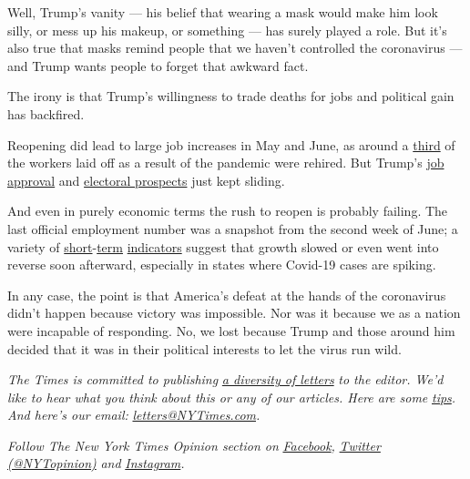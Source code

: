 Well, Trump's vanity --- his belief that wearing a mask would make him
look silly, or mess up his makeup, or something --- has surely played a
role. But it's also true that masks remind people that we haven't
controlled the coronavirus --- and Trump wants people to forget that
awkward fact.

The irony is that Trump's willingness to trade deaths for jobs and
political gain has backfired.

Reopening did lead to large job increases in May and June, as around a
\href{https://fred.stlouisfed.org/series/PAYEMS}{third} of the workers
laid off as a result of the pandemic were rehired. But Trump's
\href{https://projects.fivethirtyeight.com/trump-approval-ratings/?ex_cid=rrpromo}{job
approval} and
\href{https://projects.economist.com/us-2020-forecast/president}{electoral
prospects} just kept sliding.

And even in purely economic terms the rush to reopen is probably
failing. The last official employment number was a snapshot from the
second week of June; a variety of
\href{https://twitter.com/SaraEisen/status/1279897244494450694}{short}-\href{https://twitter.com/paulkrugman/status/1279885912059641857}{term}
\href{https://www.cnbc.com/2020/06/26/the-employment-recovery-may-be-slowing-as-virus-cases-climb.html}{indicators}
suggest that growth slowed or even went into reverse soon afterward,
especially in states where Covid-19 cases are spiking.

In any case, the point is that America's defeat at the hands of the
coronavirus didn't happen because victory was impossible. Nor was it
because we as a nation were incapable of responding. No, we lost because
Trump and those around him decided that it was in their political
interests to let the virus run wild.

\emph{The Times is committed to publishing}
\href{https://www.nytimes3xbfgragh.onion/2019/01/31/opinion/letters/letters-to-editor-new-york-times-women.html}{\emph{a
diversity of letters}} \emph{to the editor. We'd like to hear what you
think about this or any of our articles. Here are some}
\href{https://help.nytimes3xbfgragh.onion/hc/en-us/articles/115014925288-How-to-submit-a-letter-to-the-editor}{\emph{tips}}\emph{.
And here's our email:}
\href{mailto:letters@NYTimes.com}{\emph{letters@NYTimes.com}}\emph{.}

\emph{Follow The New York Times Opinion section on}
\href{https://www.facebookcorewwwi.onion/nytopinion}{\emph{Facebook}}\emph{,}
\href{http://twitter.com/NYTOpinion}{\emph{Twitter (@NYTopinion)}}
\emph{and}
\href{https://www.instagram.com/nytopinion/}{\emph{Instagram}}\emph{.}

